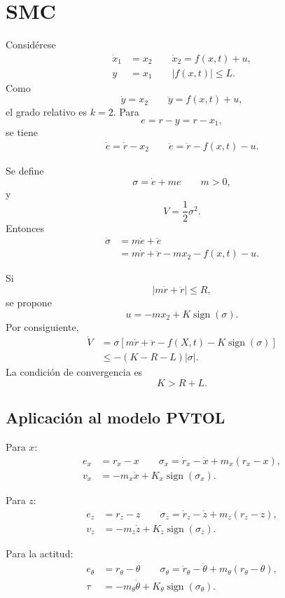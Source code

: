 \clearpage

\section{SMC}
Considérese
\begin{align*}
  \dot x_1&=x_2 \qquad
  \dot x_2=f(x,t)+u,\\
  y&=x_1 \qquad |f(x,t)|\leq L.
\end{align*}
Como
\[
  \dot y=x_2 \qquad
  \ddot y=f(x,t)+u,
\]
el grado relativo es $k=2$. Para
\[
  e=r-y=r-x_1,
\]
se tiene
\begin{align*}
  \dot e=\dot r-x_2 \qquad
  \ddot e=\ddot r-f(x,t)-u.
\end{align*}

Se define
\[
  \boxed{\sigma=\dot e+me} \qquad m>0,
\]
y
\[
  V=\frac{1}{2}\sigma^2.
\]
Entonces
\begin{align*}
  \dot\sigma
  &=m\dot e+\ddot e\\
  &=m\dot r+\ddot r-mx_2-f(x,t)-u.
\end{align*}

Si
\[
  |m\dot r+\ddot r|\leq R,
\]
se propone
\[
  \boxed{u=-mx_2+K\operatorname{sign}(\sigma)}.
\]
Por consiguiente,
\begin{align*}
  \dot V
  &=\sigma\left[m\dot r+\ddot r-f(X,t)
    -K\operatorname{sign}(\sigma)\right]\\
  &\leq -(K-R-L)|\sigma|.
\end{align*}
La condición de convergencia es
\[
  \boxed{K>R+L}.
\]

\subsection{Aplicación al modelo PVTOL}

Para $x$:
\begin{align*}
  e_x&=r_x-x \qquad
  \sigma_x=\dot r_x-\dot x+m_x(r_x-x),\\
  v_x&=-m_x\dot x+K_x\operatorname{sign}(\sigma_x).
\end{align*}

Para $z$:
\begin{align*}
  e_z&=r_z-z \qquad
  \sigma_z=\dot r_z-\dot z+m_z(r_z-z),\\
  v_z&=-m_z\dot z+K_z\operatorname{sign}(\sigma_z).
\end{align*}

Para la actitud:
\begin{align*}
  e_\theta&=r_\theta-\theta \qquad
  \sigma_\theta=\dot r_\theta-\dot{\theta}
  +m_\theta(r_\theta-\theta),\\
  \tau&=-m_\theta\dot{\theta}
  +K_\theta\operatorname{sign}(\sigma_\theta).
\end{align*}

